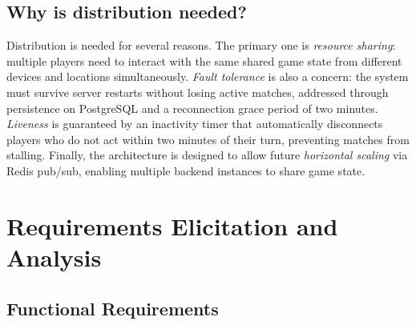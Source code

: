 \documentclass{scrartcl}
\begin{document}
\subsection*{Why is distribution needed?}

Distribution is needed for several reasons.
The primary one is \emph{resource sharing}: multiple players need to interact
with the same shared game state from different devices and locations simultaneously.
\emph{Fault tolerance} is also a concern: the system must survive server restarts
without losing active matches, addressed through persistence on PostgreSQL
and a reconnection grace period of two minutes.
\emph{Liveness} is guaranteed by an inactivity timer that automatically disconnects
players who do not act within two minutes of their turn, preventing matches from stalling.
Finally, the architecture is designed to allow future \emph{horizontal scaling}
via Redis pub/sub, enabling multiple backend instances to share game state.

\section{Requirements Elicitation and Analysis}\label{requirements}

\subsection{Functional Requirements}
\end{document}

